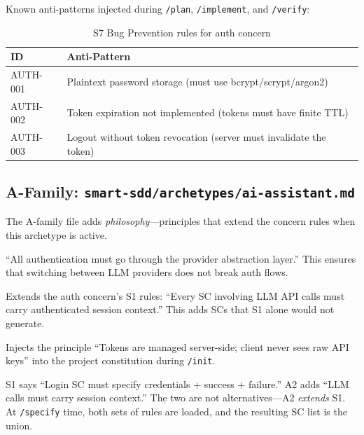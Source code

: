 \documentclass[11pt,a4paper,openright,twoside]{report}
\newcommand{\cmd}[1]{\texttt{/#1}}
\newcommand{\file}[1]{\texttt{#1}}
\begin{document}
\begin{description}[style=nextline, leftmargin=1.8cm, labelwidth=1.4cm]
  \item[S7 --- Bug Prevention]
  Known anti-patterns injected during \cmd{plan}, \cmd{implement}, and \cmd{verify}:
\end{description}

\begin{table}[H]
\centering
\caption{S7 Bug Prevention rules for auth concern}
\label{tab:auth-s7-bugs}
\begin{tabularx}{\textwidth}{lX}
\toprule
\textbf{ID} & \textbf{Anti-Pattern} \\
\midrule
AUTH-001 & Plaintext password storage (must use bcrypt/scrypt/argon2) \\
AUTH-002 & Token expiration not implemented (tokens must have finite TTL) \\
AUTH-003 & Logout without token revocation (server must invalidate the token) \\
\bottomrule
\end{tabularx}
\end{table}

\subsection{A-Family: \file{smart-sdd/archetypes/ai-assistant.md}}

The A-family file adds \emph{philosophy}---principles that extend the concern rules when this archetype is active.

\begin{description}[style=nextline, leftmargin=1.8cm, labelwidth=1.4cm]
  \item[A1 --- Philosophy]
  ``All authentication must go through the provider abstraction layer.'' This ensures that switching between LLM providers does not break auth flows.

  \item[A2 --- SC Extensions]
  Extends the auth concern's S1 rules: ``Every SC involving LLM API calls must carry authenticated session context.'' This adds SCs that S1 alone would not generate.

  \item[A4 --- Constitution Injection]
  Injects the principle ``Tokens are managed server-side; client never sees raw API keys'' into the project constitution during \cmd{init}.
\end{description}

\begin{tipbox}
S1 says ``Login SC must specify credentials + success + failure.'' A2 adds ``LLM calls must carry session context.'' The two are not alternatives---A2 \emph{extends} S1. At \cmd{specify} time, both sets of rules are loaded, and the resulting SC list is the union.
\end{tipbox}
\end{document}
